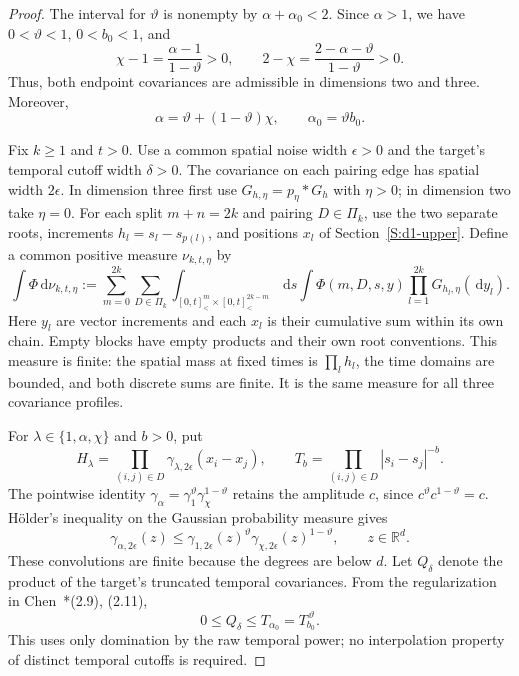 \documentclass[12pt]{article}
\numberwithin{equation}{section}
\theoremstyle{definition}
\newcommand{\R}{\mathbb{R}}
\newcommand{\ud}{\,\mathrm{d}}
\begin{document}
\begin{proof}
  The interval for $\vartheta$ is nonempty by $\alpha+\alpha_0<2$.
  Since $\alpha>1$, we have $0<\vartheta<1$, $0<b_0<1$, and
  \[
    \chi-1=\frac{\alpha-1}{1-\vartheta}>0,\qquad
    2-\chi=\frac{2-\alpha-\vartheta}{1-\vartheta}>0.
  \]
  Thus, both endpoint covariances are admissible in dimensions two and
  three. Moreover,
  \begin{equation}\label{E:static-holder-affine}
    \alpha=\vartheta+(1-\vartheta)\chi,
    \qquad \alpha_0=\vartheta b_0.
  \end{equation}

  Fix $k\ge1$ and $t>0$. Use a common spatial noise width
  $\epsilon>0$ and the target's temporal cutoff width $\delta>0$.
  The covariance on each pairing edge has spatial width $2\epsilon$.
  In dimension three first use $G_{h,\eta}=p_\eta*G_h$ with
  $\eta>0$; in dimension two take $\eta=0$. For each split $m+n=2k$
  and pairing $D\in\Pi_k$, use the two separate roots, increments
  $h_l=s_l-s_{p(l)}$, and positions $x_l$ of
  Section~\ref{S:d1-upper}. Define a common positive measure
  $\nu_{k,t,\eta}$ by
  \[
    \int\Phi\ud\nu_{k,t,\eta}
    :=\sum_{m=0}^{2k}\sum_{D\in\Pi_k}
    \int_{[0,t]^m_<\times[0,t]^{2k-m}_<}\ud s
    \int\Phi(m,D,s,y)\prod_{l=1}^{2k}G_{h_l,\eta}(\ud y_l).
  \]
  Here $y_l$ are vector increments and each $x_l$ is their cumulative
  sum within its own chain. Empty blocks have empty products and their
  own root conventions. This measure is finite: the spatial mass at
  fixed times is $\prod_lh_l$, the time domains are bounded, and both
  discrete sums are finite. It is the same measure for all three
  covariance profiles.

  For $\lambda\in\{1,\alpha,\chi\}$ and $b>0$, put
  \[
    H_\lambda=\prod_{(i,j)\in D}
    \gamma_{\lambda,2\epsilon}(x_i-x_j),\qquad
    T_b=\prod_{(i,j)\in D}|s_i-s_j|^{-b}.
  \]
  The pointwise identity
  $\gamma_\alpha=\gamma_1^{\vartheta}\gamma_\chi^{1-\vartheta}$
  retains the amplitude $c$, since $c^\vartheta c^{1-\vartheta}=c$.
  H\"older's inequality on the Gaussian probability measure gives
  \[
    \gamma_{\alpha,2\epsilon}(z)
    \le\gamma_{1,2\epsilon}(z)^\vartheta
    \gamma_{\chi,2\epsilon}(z)^{1-\vartheta},
    \qquad z\in\R^d.
  \]
  These convolutions are finite because the degrees are below $d$.
  Let $Q_\delta$ denote the product of the target's truncated temporal
  covariances. From the regularization in
  Chen~\cite{chen:author2026:time-dependency}*{(2.9), (2.11)},
  \[
    0\le Q_\delta\le T_{\alpha_0}=T_{b_0}^{\,\vartheta}.
  \]
  This uses only domination by the raw temporal power; no interpolation
  property of distinct temporal cutoffs is required.


\end{proof}
\end{document}
